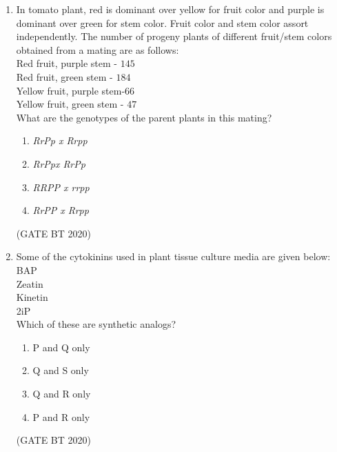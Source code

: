 \documentclass[journal,12pt,onecolumn]{IEEEtran}
\theoremstyle{remark}
\begin{document}
\begin{enumerate}[label=Q\arabic*:, start=26, leftmargin=2em]
\begin{multicols}{2}
\begin{enumerate}[label=\alph*)]
\item $S{\;\cdots\;}\xrightarrow{Z4} W\xrightarrow{Z1} X\xrightarrow{Z2}Y\xrightarrow{Z3}Z$

\end{enumerate} 
\end{multicols}
\hfill(GATE BT 2020)


\item In tomato plant, red  is dominant over yellow for fruit color and purple  is dominant over green  for stem color. Fruit color and stem color assort
independently. The number of progeny plants of different fruit/stem colors obtained from a mating are as follows:\\
Red fruit, purple stem - $145$\\
Red fruit, green stem - $184$\\
Yellow fruit, purple stem-$66$\\
Yellow fruit, green stem - $47$\\

What are the genotypes of the parent plants in this mating?
\begin{multicols}{4}
\begin{enumerate}[label=\alph*)]
\item\textit{RrPp x Rrpp}
\item\textit{RrPpx RrPp}
\item\textit{RRPP x rrpp}
\item\textit{RrPP x Rrpp}
\end{enumerate}
\end{multicols}
\hfill(GATE BT 2020)

\item Some of the cytokinins used in plant tissue culture media are given below:\\
BAP\\
Zeatin\\
Kinetin\\
2iP\\
Which of these are synthetic analogs?
\begin{multicols}{2}
\begin{enumerate}[label=\alph*)]
\item P and Q only
\item Q and S only
\item Q and R only
\item P and R only
\end{enumerate} 
\end{multicols}
\hfill(GATE BT 2020)


\end{enumerate}
\end{document}
